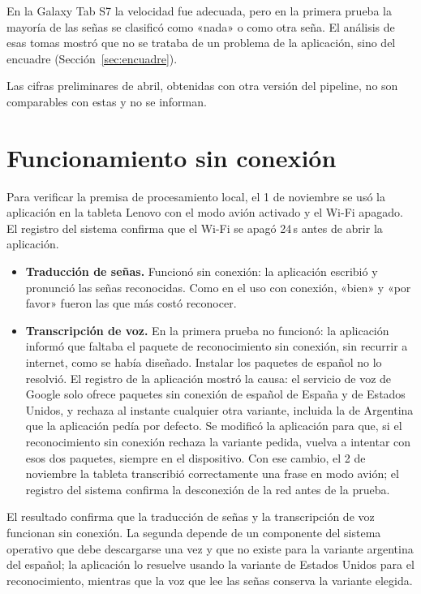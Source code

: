 En la Galaxy Tab S7 la velocidad fue adecuada, pero en la primera prueba la mayoría de las señas se clasificó como «nada» o como otra seña. El análisis de esas tomas mostró que no se trataba de un problema de la aplicación, sino del encuadre (Sección~\ref{sec:encuadre}).

Las cifras preliminares de abril, obtenidas con otra versión del pipeline, no son comparables con estas y no se informan.

\section{Funcionamiento sin conexión}
\label{sec:res-sin-conexion}

Para verificar la premisa de procesamiento local, el 1 de noviembre se usó la aplicación en la tableta Lenovo con el modo avión activado y el Wi-Fi apagado. El registro del sistema confirma que el Wi-Fi se apagó 24\,s antes de abrir la aplicación.

\begin{itemize}
    \item \textbf{Traducción de señas.} Funcionó sin conexión: la aplicación escribió y pronunció las señas reconocidas. Como en el uso con conexión, «bien» y «por favor» fueron las que más costó reconocer.
    \item \textbf{Transcripción de voz.} En la primera prueba no funcionó: la aplicación informó que faltaba el paquete de reconocimiento sin conexión, sin recurrir a internet, como se había diseñado. Instalar los paquetes de español no lo resolvió. El registro de la aplicación mostró la causa: el servicio de voz de Google solo ofrece paquetes sin conexión de español de España y de Estados Unidos, y rechaza al instante cualquier otra variante, incluida la de Argentina que la aplicación pedía por defecto. Se modificó la aplicación para que, si el reconocimiento sin conexión rechaza la variante pedida, vuelva a intentar con esos dos paquetes, siempre en el dispositivo. Con ese cambio, el 2 de noviembre la tableta transcribió correctamente una frase en modo avión; el registro del sistema confirma la desconexión de la red antes de la prueba.
\end{itemize}

El resultado confirma que la traducción de señas y la transcripción de voz funcionan sin conexión. La segunda depende de un componente del sistema operativo que debe descargarse una vez y que no existe para la variante argentina del español; la aplicación lo resuelve usando la variante de Estados Unidos para el reconocimiento, mientras que la voz que lee las señas conserva la variante elegida.

